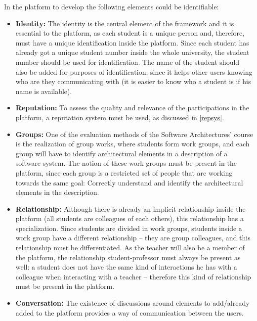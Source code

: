 In the platform to develop the following elements could be identifiable:

\begin{itemize}
\item \textbf{Identity:} The identity is the central element of the framework and it is essential to the platform, as each student is a unique person and, therefore, must have a unique identification inside the platform. Since each student has already got a unique student number inside the whole university, the student number should be used for identification. The name of the student should also be added for purposes of identification, since it helps other users knowing who are they communicating with (it is easier to know who a student is if his name is available).

\item \textbf{Reputation:} To assess the quality and relevance of the participations in the platform, a reputation system must be used, as discussed in \ref{repsys}.

\item \textbf{Groups:} One of the evaluation methods of the Software Architectures' course is the realization of group works, where students form work groups, and each group will have to identify architectural elements in a description of a software system. The notion of these work groups must be present in the platform, since each group is a restricted set of people that are working towards the same goal: Correctly understand and identify the architectural elements in the description. 

\item \textbf{Relationship:} Although there is already an implicit relationship inside the platform (all students are colleagues of each others), this relationship has a specialization. Since students are divided in work groups, students inside a work group have a different relationship – they are group colleagues, and this relationship must be differentiated. As the teacher will also be a member of the platform, the relationship student-professor must always be present as well: a student does not have the same kind of interactions he has with a colleague when interacting with a teacher – therefore this kind of relationship must be present in the platform.

\item \textbf{Conversation:} The existence of discussions around elements to add/already added to the platform provides a way of communication between the users.


\end{itemize}
